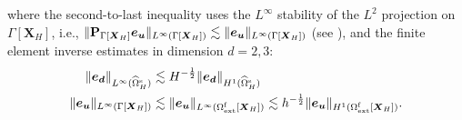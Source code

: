 \documentclass[11pt,reqno]{amsart}
\theoremstyle{definition}
\theoremstyle{plain}
\numberwithin{theorem}{section}
\numberwithin{proposition}{section}
\numberwithin{lemma}{section}
\numberwithin{equation}{section}
\newcommand{\bs}[1]{\boldsymbol{#1}}
\newcommand{\dep}{{{\bs{d}}}}
\renewcommand{\(}{\bigl(}
\renewcommand{\)}{\bigr)}
\begin{document}
where the second-to-last inequality uses the $L^\infty$ stability of the $L^2$ projection on $\Gamma[\bs X_H]$, i.e., $\|{\bf P}_{\Gamma[\bs X_H]}{\bs e}_{\bs u} \|_{L^\infty(\Gamma[\bs X_H])}\lesssim \|{\bs e}_{\bs u} \|_{L^\infty(\Gamma[\bs X_H])}$ (see \cite[Appendix B]{Li-Tang-2025}), and the finite element inverse estimates in dimension $d=2,3$: 
\begin{align*} 
\| {\bs e}_\dep  \|_{L^\infty(\widehat{\Omega}^{\rm s}_H)}
&\lesssim H^{-\frac12}\|{\bs e}_\dep  \|_{H^1(\widehat{\Omega}^{\rm s}_H)} \\
\| {\bs e}_{\bs u} \|_{L^\infty(\Gamma[\bs X_H])} 
&\lesssim 
\| {\bs e}_{\bs u} \|_{L^\infty(\Omega^{\rm f}_{\rm ext}[{\bs X}_H])}
\lesssim 
h^{-\frac12}\| {\bs e}_{\bs u} \|_{H^1(\Omega^{\rm f}_{\rm ext}[{\bs X}_H])} . 
\end{align*} 
\end{document}
